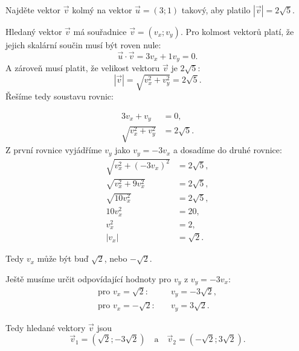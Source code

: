 \begin{example}\label{exa:angle_length_relation}
    Najděte vektor $\vec{v}$ kolmý na vektor $\vec{u} = (3; 1)$ takový, aby platilo $|\vec{v}| = 2\sqrt{5}$.

    Hledaný vektor $\vec{v}$ má souřadnice $\vec{v} = (v_x; v_y)$.
    Pro kolmost vektorů platí, že jejich skalární součin musí být roven nule:
    \[
    \vec{u} \cdot \vec{v} = 3v_x + 1v_y = 0.
    \]
    A zároveň musí platit, že velikost vektoru $\vec{v}$ je $2\sqrt{5}$:
    \[
    |\vec{v}| = \sqrt{v_x^2 + v_y^2} = 2\sqrt{5}.
    \]
    Řešíme tedy soustavu rovnic:

    \begin{align*}
        3v_x + v_y &= 0,\\
        \sqrt{v_x^2 + v_y^2} &= 2\sqrt{5}.
    \end{align*}
    Z první rovnice vyjádříme $v_y$ jako $v_y = -3v_x$ a dosadíme do druhé rovnice:
    \begin{align*}
        \sqrt{v_x^2 + (-3v_x)^2} &= 2\sqrt{5},\\
        \sqrt{v_x^2 + 9v_x^2} &= 2\sqrt{5},\\
        \sqrt{10v_x^2} &= 2\sqrt{5},\\
        10v_x^2 &= 20,\\
        v_x^2 &= 2,\\
        |v_x| &= \sqrt{2}.
    \end{align*}

    Tedy $v_x$ může být buď $\sqrt{2}$, nebo $-\sqrt{2}$.
    
    Ještě musíme určit odpovídající hodnoty pro $v_y$ z $v_y = -3v_x$:
    \begin{align*}
        \text{pro } v_x = \sqrt{2}: &\quad v_y = -3\sqrt{2},\\
        \text{pro } v_x = -\sqrt{2}: &\quad v_y = 3\sqrt{2}.
    \end{align*}

    Tedy hledané vektory $\vec{v}$ jsou
    \[
    \vec{v}_1 = (\sqrt{2}; -3\sqrt{2}) \quad \text{a} \quad \vec{v}_2 = (-\sqrt{2}; 3\sqrt{2}).
    \]
\end{example}

